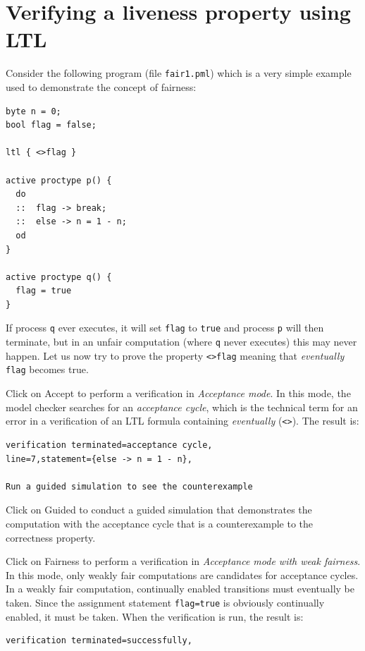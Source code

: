 \documentclass[11pt]{article}
\newcommand*{\p}[1]{\texttt{#1}}
\newcommand*{\bu}[1]{\textsf{#1}}
\begin{document}
\section{Verifying a liveness property using LTL}

Consider the following program (file \p{fair1.pml}) which is a very
simple example used to demonstrate the concept of fairness:
\begin{verbatim}
byte n = 0;
bool flag = false;

ltl { <>flag }

active proctype p() {
  do
  ::  flag -> break;
  ::  else -> n = 1 - n;
  od
}

active proctype q() {
  flag = true
}
\end{verbatim}

If process \p{q} ever executes, it will set \p{flag} to \p{true} and
process \p{p} will then terminate, but in an unfair computation (where
\p{q} never executes) this may never happen. Let us now try to prove the
property \p{<>flag} meaning that \emph{eventually} \p{flag} becomes
true. 

Click on \bu{Accept} to perform a verification in \emph{Acceptance
mode}. In this mode, the model checker searches for an \emph{acceptance
cycle}, which is the technical term for an error in a verification of an
LTL formula containing \emph{eventually} (\p{<>}). The result is:

\begin{verbatim}
verification terminated=acceptance cycle,
line=7,statement={else -> n = 1 - n},

Run a guided simulation to see the counterexample
\end{verbatim}

Click on \bu{Guided} to conduct a guided simulation that demonstrates
the computation with the acceptance cycle that is a counterexample to
the correctness property.

Click on \bu{Fairness} to perform a verification in \emph{Acceptance
mode with weak fairness}. In this mode, only weakly fair computations
are candidates for acceptance cycles. In a weakly fair computation,
continually enabled transitions must eventually be taken. Since the
assignment statement \p{flag=true} is obviously continually enabled, it
must be taken. When the verification is run, the result is:

\begin{verbatim}
verification terminated=successfully,
\end{verbatim}
\end{document}
